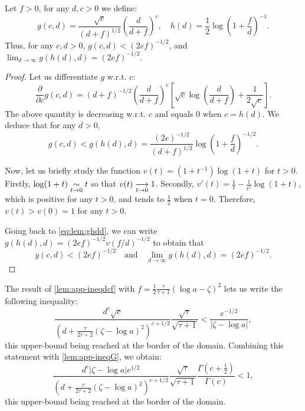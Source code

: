        \begin{lem}\label{lem:app-ineqdcf}
            Let $f>0$, for any $d,c>0$ we define:
            \begin{equation}
                g(c,d) = \frac{\sqrt{c}}{(d+f)^{1/2}}\left(\frac{d}{d+f}\right)^c, \quad h(d) = \frac{1}{2}\log\left(1+\frac{f}{d}\right)^{-1}.
            \end{equation}
            Thus, for any $c,d>0$, $g(c,d)<(2ef)^{-1/2}$, and $\displaystyle{\lim_{d\rightarrow\infty}g(h(d),d)=(2ef)^{-1/2}}.$
        \end{lem}
        \begin{proof}
            Let us differentiate $g$ w.r.t. $c$:
            \begin{equation}
                \frac{\partial}{\partial c}g(c,d) = (d+f)^{-1/2}\left(\frac{d}{d+f}\right)^c\left[\sqrt{c}\log\left(\frac{d}{d+f}  \right)+\frac{1}{2\sqrt{c}}\right].
            \end{equation}
            The above quantity is decreasing w.r.t. $c$ and equals $0$ when $c=h(d)$.
            We deduce that for any $d>0$, 
            \begin{equation}\label{eq:lem:ghdd}
                g(c,d)<g(h(d),d) = \frac{(2e)^{-1/2}}{(d+f)^{1/2}}\log\left(1+\frac{f}{d}\right)^{-1/2}.
            \end{equation}
            
            Now, let us briefly study the function $v(t)=(1+t^{-1})\log(1+t)$ for $t>0$.
            Firstly, $\log(1+t)\underset{t\rightarrow0}{\sim}t$ so that $v(t)\overset{\ }{\underset{t\rightarrow0}{\longrightarrow}}1$. Secondly, $v'(t) = \frac{1}{t}-\frac{1}{t^2}\log(1+t)$, which is positive for any $t>0$, and tends to $\frac{1}{2}$ when $t=0$. Therefore, $v(t)>v(0)=1$ for any $t>0$. 
    
            Going back to \cref{eq:lem:ghdd}, we can write $g(h(d),d)=(2ef)^{-1/2}v(f/d)^{-1/2}$ to obtain that
                \begin{equation}
                    g(c,d) <(2ef)^{-1/2}\quad\text{and} \quad \lim_{d\rightarrow\infty}g(h(d),d)=(2ef)^{-1/2}.
                \end{equation}
        \end{proof}
    
    The result of \cref{lem:app-ineqdcf} with $f=\frac{1}{2}\frac{\tau}{\tau+1}(\log a-\zeta)^2$ lets us write the following inequality:
        \begin{equation}
            \frac{d^c\sqrt{c}}{(d+\frac{\tau}{2\tau+2}(\zeta-\log a)^2 )^{c+1/2}}\frac{\sqrt{\tau}}{\sqrt{\tau +1}} < \frac{e^{-1/2}}{|\zeta-\log a|},
        \end{equation}
        this upper-bound being reached at the border of the domain. Combining this statement with \cref{lem:app-ineqG}, we obtain: 
            \begin{equation}
                \frac{d^c|\zeta-\log a|e^{1/2}}{(d+\frac{\tau}{2\tau+2}(\zeta-\log a)^2 )^{c+1/2}}\frac{\sqrt{\tau}}{\sqrt{\tau +1}}\frac{\Gamma(c+\frac{1}{2})}{\Gamma(c)} < 1,    
            \end{equation}
        this upper-bound being reached at the border of the domain.
    
